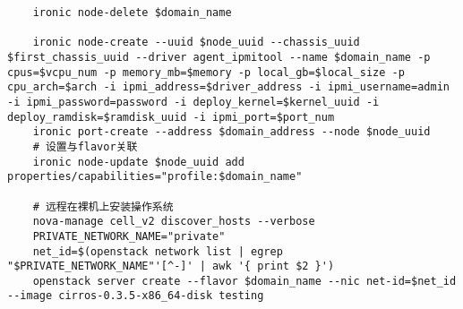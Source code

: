 \documentclass[a4paper,left=1.5cm,right=1.5cm,11pt]{article}
\begin{document}
\begin{lstlisting}
	ironic node-delete $domain_name

	ironic node-create --uuid $node_uuid --chassis_uuid $first_chassis_uuid --driver agent_ipmitool --name $domain_name -p cpus=$vcpu_num -p memory_mb=$memory -p local_gb=$local_size -p cpu_arch=$arch -i ipmi_address=$driver_address -i ipmi_username=admin -i ipmi_password=password -i deploy_kernel=$kernel_uuid -i deploy_ramdisk=$ramdisk_uuid -i ipmi_port=$port_num
	ironic port-create --address $domain_address --node $node_uuid
	# 设置与flavor关联
	ironic node-update $node_uuid add properties/capabilities="profile:$domain_name"

	# 远程在裸机上安装操作系统
	nova-manage cell_v2 discover_hosts --verbose
	PRIVATE_NETWORK_NAME="private"
	net_id=$(openstack network list | egrep "$PRIVATE_NETWORK_NAME"'[^-]' | awk '{ print $2 }')
	openstack server create --flavor $domain_name --nic net-id=$net_id --image cirros-0.3.5-x86_64-disk testing
	\end{lstlisting}
\end{document}
